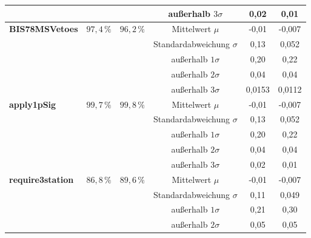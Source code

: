 \begin{sidewaystable}[htbp]
\begin{tabular}{c|c|c|c|c|c}
\multicolumn{ 1}{l|}{} & \multicolumn{ 1}{l|}{} & \multicolumn{ 1}{l|}{} & außerhalb $3\sigma$ & 0,02 & 0,01 \\ \hline
\multicolumn{ 1}{l|}{\textbf{BIS78MSVetoes}} & \multicolumn{ 1}{l|}{$97,4\,\%$} & \multicolumn{ 1}{l|}{$96,2\,\%$} & Mittelwert $\mu$ & -0,01 & -0,007 \\ \cline{ 4- 6}
\multicolumn{ 1}{l|}{} & \multicolumn{ 1}{l|}{} & \multicolumn{ 1}{l|}{} & Standardabweichung $\sigma$ & 0,13 & 0,052 \\ \cline{ 4- 6}
\multicolumn{ 1}{l|}{} & \multicolumn{ 1}{l|}{} & \multicolumn{ 1}{l|}{} & außerhalb $1\sigma$ & 0,20 & 0,22 \\ \cline{ 4- 6}
\multicolumn{ 1}{l|}{} & \multicolumn{ 1}{l|}{} & \multicolumn{ 1}{l|}{} & außerhalb $2\sigma$ & 0,04 & 0,04 \\ \cline{ 4- 6}
\multicolumn{ 1}{l|}{} & \multicolumn{ 1}{l|}{} & \multicolumn{ 1}{l|}{} & außerhalb $3\sigma$ & 0,0153 & 0,0112 \\ \hline
\multicolumn{ 1}{l|}{\textbf{apply1pSig}} & \multicolumn{ 1}{l|}{$99,7\,\%$} & \multicolumn{ 1}{l|}{$99,8\,\%$} & Mittelwert $\mu$ & -0,01 & -0,007\\ \cline{ 4- 6}
\multicolumn{ 1}{l|}{} & \multicolumn{ 1}{l|}{} & \multicolumn{ 1}{l|}{} & Standardabweichung $\sigma$ & 0,13 & 0,052 \\ \cline{ 4- 6}
\multicolumn{ 1}{l|}{} & \multicolumn{ 1}{l|}{} & \multicolumn{ 1}{l|}{} & außerhalb $1\sigma$ & 0,20 & 0,22 \\ \cline{ 4- 6}
\multicolumn{ 1}{l|}{} & \multicolumn{ 1}{l|}{} & \multicolumn{ 1}{l|}{} & außerhalb $2\sigma$ & 0,04 & 0,04 \\ \cline{ 4- 6}
\multicolumn{ 1}{l|}{} & \multicolumn{ 1}{l|}{} & \multicolumn{ 1}{l|}{} & außerhalb $3\sigma$ & 0,02 & 0,01 \\ \hline
\multicolumn{ 1}{l|}{\textbf{require3station}} & \multicolumn{ 1}{l|}{$86,8\,\%$} & \multicolumn{ 1}{l|}{$89,6\,\%$} & Mittelwert $\mu$ & -0,01 & -0,007 \\ \cline{ 4- 6}
\multicolumn{ 1}{l|}{} & \multicolumn{ 1}{l|}{} & \multicolumn{ 1}{l|}{} & Standardabweichung $\sigma$ & 0,11 & 0,049 \\ \cline{ 4- 6}
\multicolumn{ 1}{l|}{} & \multicolumn{ 1}{l|}{} & \multicolumn{ 1}{l|}{} & außerhalb $1\sigma$ & 0,21 & 0,30 \\ \cline{ 4- 6}
\multicolumn{ 1}{l|}{} & \multicolumn{ 1}{l|}{} & \multicolumn{ 1}{l|}{} & außerhalb $2\sigma$ & 0,05 & 0,05 \\ \cline{ 4- 6}

\end{tabular}
\end{sidewaystable}
